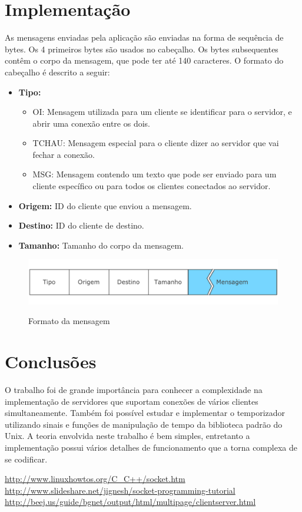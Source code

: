 \documentclass[a4paper,10pt]{article}
\begin{document}
\section{Implementação}

As mensagens enviadas pela aplicação são enviadas na forma de sequência de
bytes. Os 4 primeiros bytes são usados no cabeçalho. Os bytes subsequentes contêm o corpo da
mensagem, que pode ter até 140 caracteres. O formato do cabeçalho é descrito a
seguir:

\begin{itemize}
 \item \textbf{Tipo:}
  \begin{itemize}
    \item OI: Mensagem utilizada para um cliente se identificar para o
    servidor, e abrir uma conexão entre os dois.
    \item TCHAU: Mensagem especial para o cliente dizer ao servidor que
    vai fechar a conexão.
    \item MSG: Mensagem contendo um texto que pode ser enviado para um
    cliente específico ou para todos os clientes conectados ao servidor.
  \end{itemize}
 \item \textbf{Origem:} ID do cliente que enviou a mensagem.
 \item \textbf{Destino:} ID do cliente de destino.
 \item \textbf{Tamanho:} Tamanho do corpo da mensagem.
\end{itemize}

\begin{figure}[ht!]
\begin{center}
\includegraphics[scale=0.6]{imagens/mensagem.pdf}
\label{fig:mensagem}
\caption{Formato da mensagem}
\end{center}
\end{figure}

\section{Conclusões}

O trabalho foi de grande importância para conhecer a complexidade na
implementação de servidores que suportam conexões de vários clientes
simultaneamente. Também foi possível estudar e implementar o temporizador
utilizando sinais e funções de manipulação de tempo da biblioteca padrão do
Unix. A teoria envolvida neste trabalho é bem simples, entretanto a implementação possui vários detalhes de funcionamento que a
torna complexa de se codificar.

\clearpage
\begin{thebibliography}{99}
 \url{http://www.linuxhowtos.org/C_C++/socket.htm}
 \url{http://www.slideshare.net/jignesh/socket-programming-tutorial}
 \url{http://beej.us/guide/bgnet/output/html/multipage/clientserver.html}
\end{thebibliography}
\end{document}

